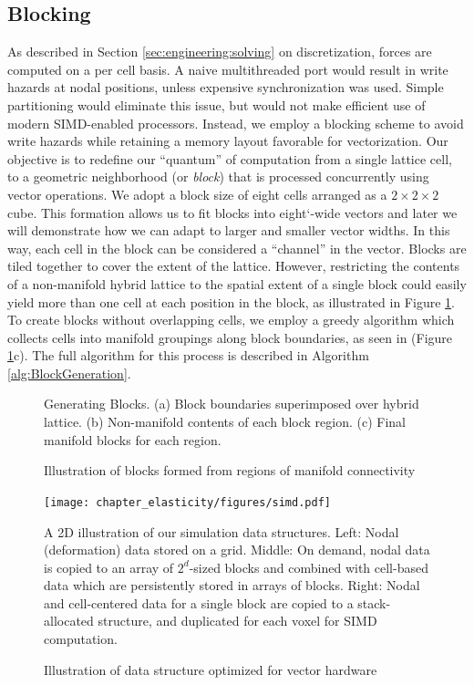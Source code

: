 \subsection{Blocking}

As described in Section \ref{sec:engineering:solving} on
discretization, forces are computed on a per cell basis. A naive
multithreaded port would result in write hazards at nodal positions,
unless expensive synchronization was used. Simple partitioning would
eliminate this issue, but would not make efficient use of
modern SIMD-enabled processors. Instead, we employ a blocking scheme to avoid write
hazards while retaining a memory layout favorable for
vectorization. Our objective is to redefine our ``quantum'' of
computation from a single lattice cell, to a geometric neighborhood
(or \emph{block}) that is processed concurrently using vector
  operations.  We adopt a block size of eight cells
arranged as a $2\times 2\times 2$ cube. This formation
allows us to fit blocks into eight\char`-wide
vectors and later we will demonstrate how we can
adapt to larger and smaller vector widths. In this way,
each cell in the block can be considered a ``channel'' in the
vector.  Blocks are tiled together to cover the
  extent of the lattice. However, restricting the contents of a
  non-manifold hybrid lattice to the spatial extent of a single block
  could easily yield more than one cell at each position in the block,
  as illustrated in Figure \ref{fig:blocking}. To create blocks
  without overlapping cells, we employ a greedy algorithm which
  collects cells into manifold groupings along block boundaries, as
  seen in (Figure \ref{fig:blocking}c). The full algorithm for this
  process is described in Algorithm \ref{alg:BlockGeneration}.


\label{sec:blocking}
\begin{figure}[b!]
  \centering
  \def\svgwidth{\columnwidth}
  \vspace*{-.15in}
  
\vspace*{-.5in}
\caption{Illustration of blocks formed from regions of manifold connectivity}{Generating Blocks. (a) Block boundaries superimposed over
hybrid lattice. (b) Non-manifold contents of each block region. (c)
Final manifold blocks for each region.}
\label{fig:blocking}
\end{figure}
  
\begin{figure}[t]
   \texttt{[image: chapter\_elasticity/figures/simd.pdf]}
   \vspace*{-.3in}
   \caption{Illustration of data structure optimized for vector
     hardware}{A 2D illustration of our simulation data
     structures. Left: Nodal (deformation) data stored on a
     grid. Middle: On demand, nodal data is copied to an array of
     $2^d$-sized blocks and combined with cell-based data which are
     persistently stored in arrays of blocks. Right: Nodal and
     cell-centered data for a single block are copied to a
     stack-allocated structure, and duplicated for each voxel for SIMD
     computation.}
   \label{fig:simd}
   \vspace*{-.15in}
\end{figure}
  
